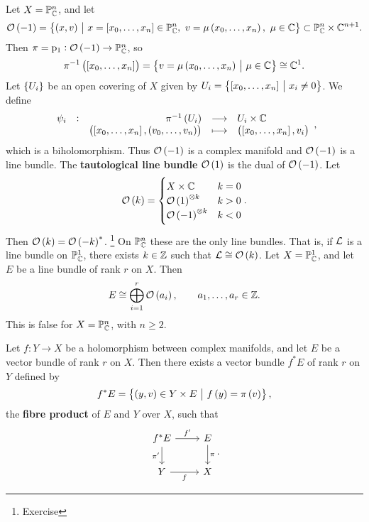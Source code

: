 \begin{example}
Let $ X = \mathbb{P}_{\mathbb{C}}^n $, and let
$$ \OOO\br{-1} = \cbr{\br{x, v} \st x = \sbr{x_0, \dots, x_n} \in \PP_\CC^n, \ v = \mu\br{x_0, \dots, x_n}, \ \mu \in \CC} \subset \PP_\CC^n \times \CC^{n + 1}. $$
Then $ \pi = \p_1 : \OOO\br{-1} \to \PP_\CC^n $, so
$$ \pi^{-1}\br{\sbr{x_0, \dots, x_n}} = \cbr{v = \mu\br{x_0, \dots, x_n} \st \mu \in \CC} \cong \CC^1. $$
Let $ \cbr{U_i} $ be an open covering of $ X $ given by $ U_i = \cbr{\sbr{x_0, \dots, x_n} \st x_i \ne 0} $. We define
$$ \function[\psi_i]{\pi^{-1}\br{U_i}}{U_i \times \CC}{\br{\sbr{x_0, \dots, x_n}, \br{v_0, \dots, v_n}}}{\br{\sbr{x_0, \dots, x_n}, v_i}}, $$
which is a biholomorphism. Thus $ \OOO\br{-1} $ is a complex manifold and $ \OOO\br{-1} $ is a line bundle. The \textbf{tautological line bundle} $ \OOO\br{1} $ is the dual of $ \OOO\br{-1} $. Let
$$ \OOO\br{k} =
\begin{cases}
X \times \CC & k = 0 \\
\OOO\br{1}^{\otimes k} & k > 0 \\
\OOO\br{-1}^{\otimes k} & k < 0
\end{cases}.
$$
Then $ \OOO\br{k} = \OOO\br{-k}^* $. \footnote{Exercise} On $ \mathbb{P}_{\mathbb{C}}^n $ these are the only line bundles. That is, if $ \mathcal{L} $ is a line bundle on $ \mathbb{P}_{\mathbb{C}}^1 $, there exists $ k \in \mathbb{Z} $ such that $ \LLL \cong \OOO\br{k} $. Let $ X = \mathbb{P}_{\mathbb{C}}^1 $, and let $ E $ be a line bundle of rank $ r $ on $ X $. Then
$$ E \cong \bigoplus_{i = 1}^r \OOO\br{a_i}, \qquad a_1, \dots, a_r \in \ZZ. $$
This is false for $ X = \mathbb{P}_{\mathbb{C}}^n $, with $ n \ge 2 $.
\end{example}

\pagebreak

\begin{definition}
Let $ f : Y \to X $ be a holomorphism between complex manifolds, and let $ E $ be a vector bundle of rank $ r $ on $ X $. Then there exists a vector bundle $ f^*E $ of rank $ r $ on $ Y $ defined by
$$ f^*E = \cbr{\br{y, v} \in Y \times E \st f\br{y} = \pi\br{v}}, $$
the \textbf{fibre product} of $ E $ and $ Y $ over $ X $, such that
$$
\begin{tikzcd}
f^*E \arrow{r}{f'} \arrow{d}[swap]{\pi'} & E \arrow{d}{\pi} \\
Y \arrow{r}[swap]{f} & X
\end{tikzcd}.
$$
\end{definition}

